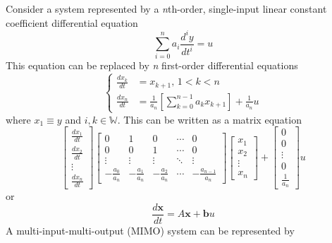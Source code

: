 \documentclass[11pt]{book}
\theoremstyle{example}
\begin{document}
Consider a system represented by a \emph{n}th-order, single-input linear constant coefficient differential equation
\begin{equation}
	\sum_{i=0}^n{a_i\frac{d^iy}{dt^i}}=u
\end{equation}
This equation can be replaced by \emph{n} first-order differential equations
\begin{equation}
	\left\{
		\begin{aligned}
			\frac{dx_k}{dt}&=x_{k+1},\,1<k<n\\
			\frac{dx_n}{dt}&=\frac{1}{a_n}\left[\sum_{k=0}^{n-1}{a_kx_{k+1}}\right]+\frac{1}{a_n}u
		\end{aligned}
	\right.
\end{equation}
where $x_1\equiv{y}$ and $i,k\in\mathbb{W}$. This can be written as a matrix equation
\begin{equation}
	\begin{bmatrix}
		\frac{dx_1}{dt}\\
		\frac{dx_2}{dt}\\
		\vdots\\
		\frac{dx_n}{dt}
	\end{bmatrix}
	\begin{bmatrix}
		0&1&0&\cdots&0\\
		0&0&1&\cdots&0\\
		\vdots&\vdots&\vdots&\ddots&\vdots\\
		-\frac{a_0}{a_n}&-\frac{a_1}{a_n}&-\frac{a_2}{a_n}&\cdots&-\frac{a_{n-1}}{a_n}
	\end{bmatrix}
	\begin{bmatrix}
		x_1\\
		x_2\\
		\vdots\\
		x_n
	\end{bmatrix}+
	\begin{bmatrix}
		0\\
		0\\
		\vdots\\
		0\\
		\frac{1}{a_n}
	\end{bmatrix}u
\end{equation}
or
\begin{equation}
	\frac{d\mathbf{x}}{dt}=A\mathbf{x}+\mathbf{b}u
\end{equation}
A multi-input-multi-output (MIMO) system can be represented by
\end{document}
